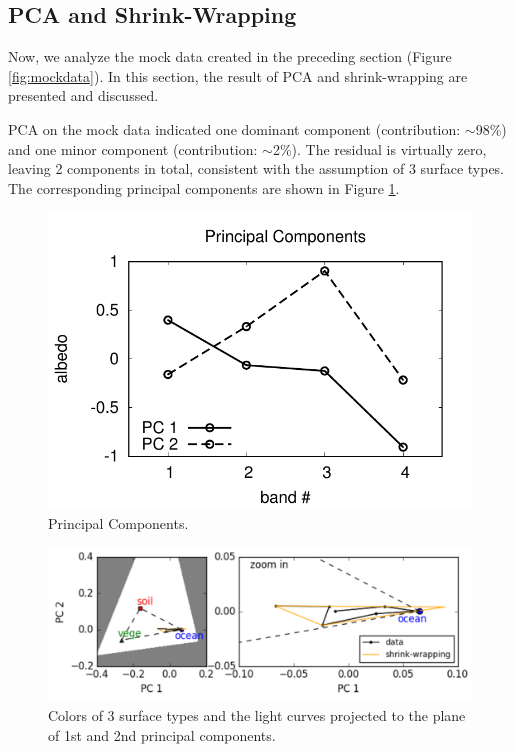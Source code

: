 \documentclass[iop,numberedappendix,apj,]{emulateapj}
\begin{document}
\newpage

\subsection{PCA and Shrink-Wrapping}
\label{ss:shrinkwrap}


Now, we analyze the mock data created in the preceding section (Figure \ref{fig:mockdata}). 
In this section, the result of PCA and shrink-wrapping are presented and discussed. 

PCA on the mock data indicated one dominant component (contribution: $\sim $98\%) and one minor component (contribution: $\sim $2\%). The residual is virtually zero, leaving 2 components in total, consistent with the assumption of 3 surface types. 
The corresponding principal components are shown in Figure \ref{fig:PCs}. 


\begin{figure}[th]
    \begin{center}
\includegraphics[width=0.9\hsize]{PCA_V_jn.pdf}
    \end{center}
    \caption{Principal Components. }
\label{fig:PCs}
\end{figure}


\begin{figure}[b]
    \begin{center}
\includegraphics[width=\hsize]{mockdata_quadrature_PCplane.pdf}
    \end{center}
    \caption{Colors of 3 surface types and the light curves projected to the plane of 1st and 2nd principal components. }
\label{fig:shrinkwrap}
\end{figure}
\end{document}

